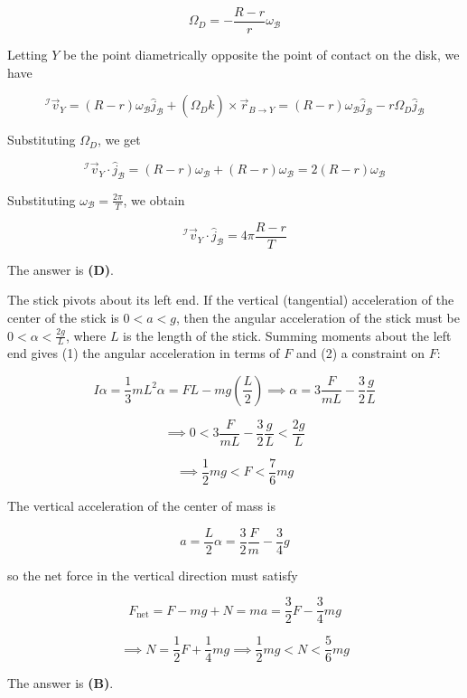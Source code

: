 \documentclass[12pt]{article}
\begin{document}
$$\Omega_D = -\frac{R - r}{r} \omega_\mathcal{B}$$

Letting $Y$ be the point diametrically opposite the point of contact on the disk, we have

$$^\mathcal{I} \vec{v}_Y = (R - r) \omega_\mathcal{B} \hat{j}_\mathcal{B} + (\Omega_D \hat{k}) \times \vec{r}_{B \to Y} = (R - r) \omega_\mathcal{B} \hat{j}_\mathcal{B} - r \Omega_D \hat{j}_\mathcal{B}$$

Substituting $\Omega_D$, we get

$$^\mathcal{I} \vec{v}_Y \cdot \hat{j}_\mathcal{B} = (R - r) \omega_\mathcal{B} + (R - r) \omega_\mathcal{B} = 2 (R - r) \omega_\mathcal{B}$$

Substituting $\omega_\mathcal{B} = \frac{2 \pi}{T}$, we obtain

$$^\mathcal{I} \vec{v}_Y \cdot \hat{j}_\mathcal{B} = 4 \pi \frac{R - r}{T}$$

The answer is \textbf{(D)}.


\vspace{2 \baselineskip}



The stick pivots about its left end. If the vertical (tangential) acceleration of the center of the stick is $0 < a < g$, then the angular acceleration of the stick must be $0 < \alpha < \frac{2 g}{L}$, where $L$ is the length of the stick. Summing moments about the left end gives (1) the angular acceleration in terms of $F$ and (2) a constraint on $F$:

$$I \alpha = \frac{1}{3} m L^2 \alpha = F L - m g \left( \frac{L}{2} \right) \implies \alpha = 3 \frac{F}{m L} - \frac{3}{2} \frac{g}{L}$$

$$\implies 0 < 3 \frac{F}{m L} - \frac{3}{2} \frac{g}{L} < \frac{2 g}{L}$$

$$\implies \frac{1}{2} m g < F < \frac{7}{6} m g$$

The vertical acceleration of the center of mass is

$$a = \frac{L}{2} \alpha = \frac{3}{2} \frac{F}{m} - \frac{3}{4} g$$

so the net force in the vertical direction must satisfy

$$F_\text{net} = F - m g + N = m a = \frac{3}{2} F - \frac{3}{4} m g$$

$$\implies N = \frac{1}{2} F + \frac{1}{4} m g \implies \frac{1}{2} m g < N < \frac{5}{6} m g$$

The answer is \textbf{(B)}.


\vspace{2 \baselineskip}
\end{document}

